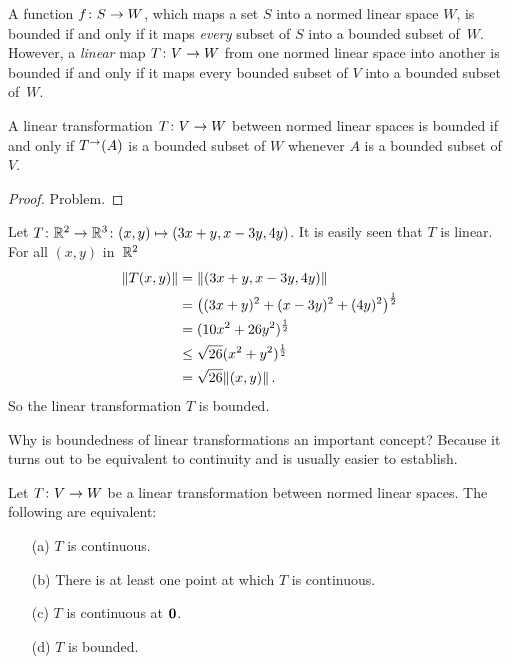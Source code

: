 A function $f\colon S \rightarrow W$, which maps a set $S$ into a normed linear space $W$, is bounded
if and only if it maps \emph{every} subset of $S$ into a bounded subset of~$W$.  However, a
\emph{linear} map $T\colon V \rightarrow W$ from one normed linear space into another is bounded if
and only if it maps every bounded subset of $V$ into a bounded subset of~$W$.

\begin{prop}  A linear transformation $T\colon V \rightarrow W$ between normed linear spaces is bounded
if and only if $T^\rightarrow(A)$ is a bounded subset of $W$ whenever $A$ is a bounded subset of~$V$.
\end{prop}

\begin{proof} Problem.  \ns   \end{proof}

\begin{exam}\label{exam_bdd_lt}  Let $T \colon \mathbb{R}^2 \rightarrow \mathbb{R}^3 \colon (x,y)
\mapsto (3x + y,x - 3y,4y)$.  It is easily seen that $T$ is linear. For all $(x,y)$ in~$\mathbb{R}^2$
 \begin{align*}
   \lVert T(x,y)\rVert
           &= \lVert(3x + y,x - 3y,4y)\rVert \\
           &= \bigl((3x + y)^2 + (x - 3y)^2 + (4y)^2\bigr)^{\frac12} \\
           &= (10x^2 + 26y^2)^{\frac12} \\
           &\le \sqrt{26}(x^2 + y^2)^{\frac12} \\
           &= \sqrt{26}\lVert(x,y)\rVert\,.
 \end{align*}
So the linear transformation $T$ is bounded.
\end{exam}

Why is boundedness of linear transformations an important concept? Because it turns out to be
equivalent to continuity and is usually easier to establish.

\begin{prop}\label{prop_equiv_cont}  Let $T\colon V \rightarrow W$ be a linear transformation between
normed linear spaces.  The following are equivalent:
 \begin{enumerate}
  \item[(a)] $T$ is continuous.
  \item[(b)] There is at least one point at which $T$ is continuous.
  \item[(c)] $T$ is continuous at $\mathbf{0}$.
  \item[(d)] $T$ is bounded.
 \end{enumerate}
\end{prop}


